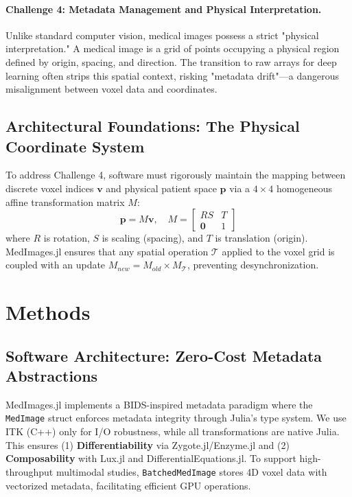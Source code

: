 \documentclass[10pt,letterpaper]{article}
\begin{document}
\paragraph{Challenge 4: Metadata Management and Physical Interpretation.}
Unlike standard computer vision, medical images possess a strict "physical interpretation." A medical image is a grid of points occupying a physical region defined by origin, spacing, and direction. The transition to raw arrays for deep learning often strips this spatial context, risking "metadata drift"—a dangerous misalignment between voxel data and coordinates.

\subsection*{Architectural Foundations: The Physical Coordinate System}
To address Challenge 4, software must rigorously maintain the mapping between discrete voxel indices $\mathbf{v}$ and physical patient space $\mathbf{p}$ via a $4 \times 4$ homogeneous affine transformation matrix $M$:
\begin{equation}
\mathbf{p} = M \mathbf{v}, \quad M = 
\begin{bmatrix} 
R S & T \\
\mathbf{0} & 1
\end{bmatrix}
\end{equation}
where $R$ is rotation, $S$ is scaling (spacing), and $T$ is translation (origin). MedImages.jl ensures that any spatial operation $\mathcal{T}$ applied to the voxel grid is coupled with an update $M_{new} = M_{old} \times M_{\mathcal{T}}$, preventing desynchronization.

\section{Methods}

\subsection*{Software Architecture: Zero-Cost Metadata Abstractions}
MedImages.jl implements a BIDS-inspired metadata paradigm where the \texttt{MedImage} struct enforces metadata integrity through Julia's type system. We use ITK (C++) only for I/O robustness, while all transformations are native Julia. This ensures (1) \textbf{Differentiability} via Zygote.jl/Enzyme.jl and (2) \textbf{Composability} with Lux.jl and DifferentialEquations.jl. To support high-throughput multimodal studies, \texttt{BatchedMedImage} stores 4D voxel data with vectorized metadata, facilitating efficient GPU operations.
\end{document}
